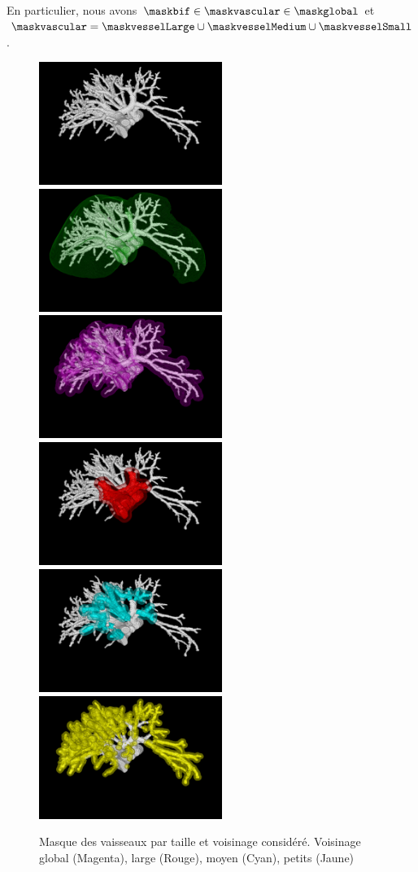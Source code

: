 En particulier, nous avons $\maskbif \in \maskvascular \in \maskglobal$ et $\maskvascular = \maskvesselLarge \cup \maskvesselMedium \cup \maskvesselSmall$.

\begin{figure}[!ht]
  \centering
  \includegraphics[height=4cm]{Images/vs_gt.png}
  \includegraphics[height=4cm]{Images/vs_gt_liver.png}
  \includegraphics[height=4cm]{Images/vs_VN.png}
  \includegraphics[height=4cm]{Images/vs_large.png}
  \includegraphics[height=4cm]{Images/vs_medium.png}
  \includegraphics[height=4cm]{Images/vs_small.png}
  \caption{Masque des vaisseaux par taille et voisinage considéré. Voisinage global (Magenta), large (Rouge), moyen (Cyan), petits (Jaune)}
  \label{fig:vs_masks}
\end{figure}

